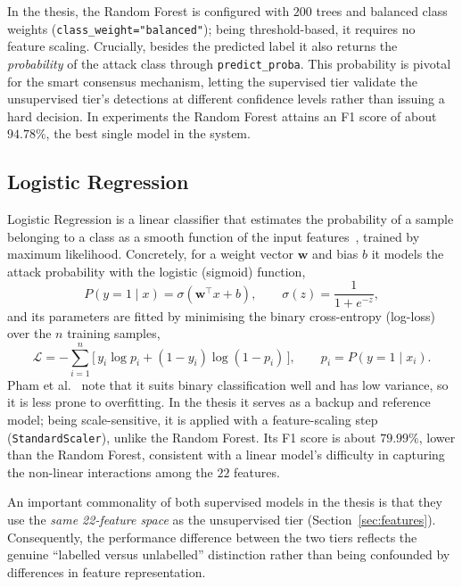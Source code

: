 \documentclass[../main.tex]{subfiles}
\begin{document}
In the thesis, the Random Forest is configured with $200$ trees and
balanced class weights (\texttt{class\_weight="balanced"}); being
threshold-based, it requires no feature scaling. Crucially, besides the
predicted label it also returns the \emph{probability} of the attack class
through \texttt{predict\_proba}. This probability is pivotal for the smart
consensus mechanism, letting the supervised tier validate the unsupervised
tier's detections at different confidence levels rather than issuing a hard
decision. In experiments the Random Forest attains an F1 score of about
$94.78\%$, the best single model in the system.

\subsection{Logistic Regression}

Logistic Regression is a linear classifier that estimates the probability
of a sample belonging to a class as a smooth function of the input
features~\cite{pham2016}, trained by maximum likelihood. Concretely, for a
weight vector $\mathbf{w}$ and bias $b$ it models the attack probability with
the logistic (sigmoid) function,
\begin{equation}
  P(y=1 \mid x) = \sigma(\mathbf{w}^{\top}x + b),
  \qquad
  \sigma(z) = \frac{1}{1 + e^{-z}},
  \label{eq:sigmoid}
\end{equation}
and its parameters are fitted by minimising the binary cross-entropy
(log-loss) over the $n$ training samples,
\begin{equation}
  \mathcal{L} = -\sum_{i=1}^{n}
  \Big[\, y_i \log p_i + (1-y_i)\log(1-p_i) \,\Big],
  \qquad p_i = P(y=1 \mid x_i).
  \label{eq:logloss}
\end{equation}
Pham et al.~\cite{pham2016} note that it suits binary classification well and
has low variance, so it is less prone to overfitting. In the thesis it serves
as a backup and reference model; being scale-sensitive, it is applied with
a feature-scaling step (\texttt{StandardScaler}), unlike the Random Forest.
Its F1 score is about $79.99\%$, lower than the Random Forest, consistent
with a linear model's difficulty in capturing the non-linear interactions
among the $22$ features.

An important commonality of both supervised models in the thesis is that
they use the \emph{same 22-feature space} as the unsupervised tier
(Section~\ref{sec:features}). Consequently, the performance difference
between the two tiers reflects the genuine ``labelled versus unlabelled''
distinction rather than being confounded by differences in feature
representation.
\end{document}
